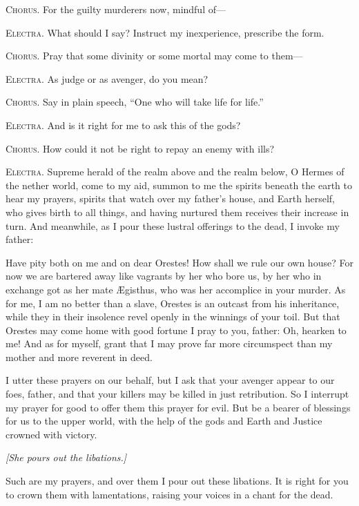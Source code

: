 \documentclass[12pt]{article}
\begin{document}
\textsc{Chorus.} For the guilty murderers now, mindful of---

\textsc{Electra.} What should I say? Instruct my inexperience, prescribe the form.

\textsc{Chorus.} Pray that some divinity or some mortal may come to them---

\textsc{Electra.} As judge or as avenger, do you mean?

\textsc{Chorus.} Say in plain speech, ``One who will take life for life.''

\textsc{Electra.} And is it right for me to ask this of the gods?

\textsc{Chorus.} How could it not be right to repay an enemy with ills?

\textsc{Electra.} Supreme herald of the realm above and the realm below, O Hermes of the nether world, come to my aid, summon to me the spirits beneath the earth to hear my prayers, spirits that watch over my father's house, and Earth herself, who gives birth to all things, and having nurtured them receives their increase in turn. And meanwhile, as I pour these lustral offerings to the dead, I invoke my father:

Have pity both on me and on dear Orestes! How shall we rule our own house? For now we are bartered away like vagrants by her who bore us, by her who in exchange got as her mate {\AE}gisthus, who was her accomplice in your murder. As for me, I am no better than a slave, Orestes is an outcast from his inheritance, while they in their insolence revel openly in the winnings of your toil. But that Orestes may come home with good fortune I pray to you, father: Oh, hearken to me! And as for myself, grant that I may prove far more circumspect than my mother and more reverent in deed.

I utter these prayers on our behalf, but I ask that your avenger appear to our foes, father, and that your killers may be killed in just retribution. So I interrupt my prayer for good to offer them this prayer for evil. But be a bearer of blessings for us to the upper world, with the help of the gods and Earth and Justice crowned with victory.

\begin{center}
\textit{[She pours out the libations.]}
\end{center}

Such are my prayers, and over them I pour out these libations. It is right for you to crown them with lamentations, raising your voices in a chant for the dead.
\end{document}
